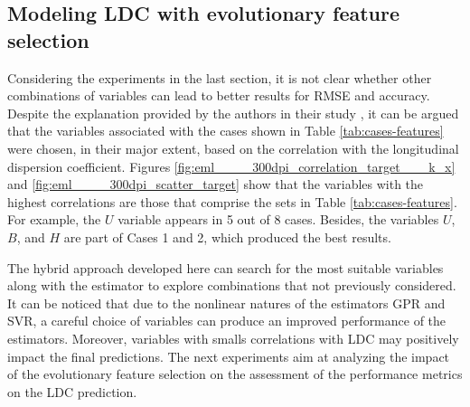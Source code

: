 \documentclass[a4paper,12pt, english]{article}
\begin{document}



\subsection{\label{sec:ldc-efs} Modeling LDC with evolutionary feature selection}


Considering the experiments in the last section, it is not clear whether other combinations of variables can lead to better results for RMSE and accuracy. Despite the explanation provided by the authors in their study \cite{tayfur2005predicting}, it can be argued that the variables associated with the cases shown in Table \ref{tab:cases-features} were chosen, in their major extent,  based on the correlation with the longitudinal dispersion coefficient. Figures \ref{fig:eml____300dpi_correlation_target___k_x} and \ref{fig:eml____300dpi_scatter_target} show that the variables with the highest correlations are those that comprise the sets in  Table \ref{tab:cases-features}.
For example, the $U$ variable appears in 5 out of 8 cases. Besides, the variables $U$, $B$, and $H$ are part of Cases 1 and 2, which produced the best results.

The hybrid approach developed here can search for the most suitable variables along with the estimator to explore combinations that not previously considered.  It can be noticed that due to the nonlinear natures of the estimators GPR and SVR,
a careful choice of variables can produce an improved performance of the estimators. Moreover, variables with smalls correlations with LDC may positively impact the final predictions. The next experiments aim at analyzing the impact of the evolutionary feature selection on the assessment of the performance metrics on the LDC prediction.
\end{document}

